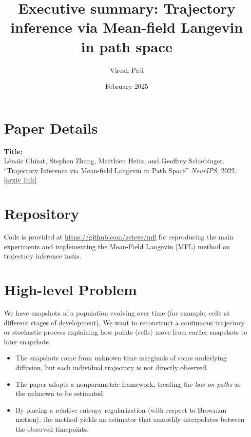 \documentclass{article}
\title{Executive summary: Trajectory inference via Mean-field Langevin in path space}
\author{Viresh Pati}
\date{February 2025}
\begin{document}
\maketitle

\section{Paper Details}
\textbf{Title:} 
\\
L\'ena\"ic Chizat, Stephen Zhang, Matthieu Heitz, and Geoffrey Schiebinger.
\\
``Trajectory Inference via Mean-field Langevin in Path Space'' 
\textit{NeurIPS}, 2022.
\\
\href{https://arxiv.org/abs/2205.07146}{[arxiv link]}

\section{Repository}
Code is provided at \url{https://github.com/zsteve/mfl} for reproducing the main experiments 
and implementing the Mean-Field Langevin (MFL) method on trajectory inference tasks.

\section{High-level Problem}
We have snapshots of a population evolving over time (for example, cells at different stages of development). We want to reconstruct a continuous trajectory or stochastic process explaining how points (cells) move from earlier snapshots to later snapshots.

\begin{itemize}
    \item The snapshots come from unknown time marginals of some underlying diffusion, but each individual trajectory is not directly observed.
    \item The paper adopts a nonparametric framework, treating the \emph{law on paths} as the unknown to be estimated.
    \item By placing a relative-entropy regularization (with respect to Brownian motion), the method yields an estimator that smoothly interpolates between the observed timepoints.
\end{itemize}
\end{document}
